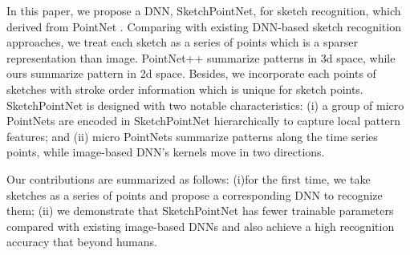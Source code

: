 In this paper, we propose a DNN, SketchPointNet, for sketch recognition, which derived from PointNet \cite{qi2017pointnet}. Comparing with existing DNN-based sketch recognition approaches, we treat each sketch as a series of points which is a sparser representation than image. PointNet++ \cite{qi2017pointnetplusplus} summarize patterns in 3d space, while ours summarize pattern in 2d space. Besides, we incorporate each points of sketches with stroke order information which is unique for sketch points. SketchPointNet is designed with two notable characteristics: (i) a group of micro PointNets are encoded in SketchPointNet hierarchically to capture local pattern features; and (ii) micro PointNets summarize patterns along the time series points, while image-based DNN's kernels move in two directions.

Our contributions are summarized as follows: (i)for the first time, we take sketches as a series of points and propose a corresponding DNN to recognize them; (ii) we demonstrate that SketchPointNet has fewer trainable parameters compared with existing image-based DNNs and also achieve a high recognition accuracy that beyond humans.

